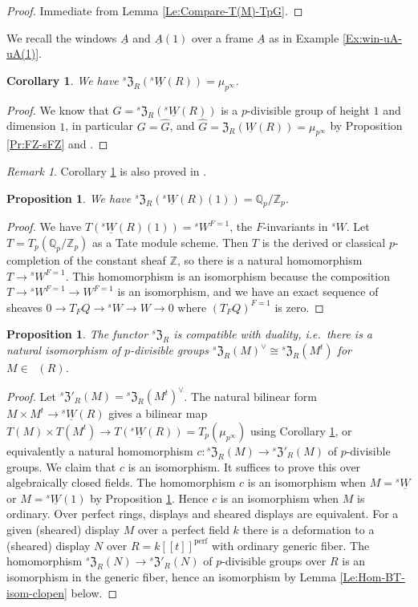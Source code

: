 \documentclass[a4paper,11pt]{amsart}
\theoremstyle{plain}
\newtheorem{Prop}[equation]{Proposition}
\newtheorem{Cor}[equation]{Corollary}
\theoremstyle{definition}
\theoremstyle{remark}
\newtheorem{Remark}[equation]{Remark}
\newcommand{\bPr}{\begin{Prop}}
\newcommand{\ePr}{\end{Prop}}
\newcommand{\bCo}{\begin{Cor}}
\newcommand{\eCo}{\end{Cor}}
\newcommand{\bRe}{\begin{Remark}}
\newcommand{\eRe}{\end{Remark}}
\newcommand{\bproof}{\begin{proof}}
\newcommand{\eproof}{\end{proof}}
\renewcommand{\u}{\underline}
\newcommand{\uM}{M} %
\newcommand{\uN}{N} %
\numberwithin{equation}{section}
\newcommand{\FZ}{\mathfrak{Z}}
\newcommand{\QQ}{{\mathbb{Q}}}
\newcommand{\ZZ}{{\mathbb{Z}}}
\DeclareMathOperator{\perf}{perf}
\DeclareMathOperator{\sDisp}{{}^sDisp}
\newcommand{\limperf}{^{\perf}}
\newcommand{\sFZ}{{}^s\FZ}
\newcommand{\sW}{{}^sW}
\newcommand{\usW}{{}^s\u W}
\begin{document}
\bproof
Immediate from Lemma \ref{Le:Compare-T(M)-TpG}.
\eproof

We recall the windows $\u A$ and $\u A(1)$ over a frame $\u A$ as in Example \ref{Ex:win-uA-uA(1)}.

\bCo
\label{Co:sFZ-usW-Gm}
We have $\sFZ_R(\usW(R))=\mu_{p^\infty}$.
\eCo

\bproof
We know that $G=\sFZ_R(\usW(R))$ is a $p$-divisible group of height $1$ and dimension $1$, in particular $G=\hat G$, and $\hat G=\FZ_R(\u W(R))=\mu_{p^{\infty}}$ by Proposition \ref{Pr:FZ-sFZ} and \cite[(211)]{Zink:The-display}. 
\eproof

\bRe
Corollary \ref{Co:sFZ-usW-Gm} is also proved in \cite[\S 3.6]{Drinfeld:Ring-stacks-conjecturally}.
\eRe

\bPr
\label{Pr:sFZ-usW1-QpZp}
We have $\sFZ_R(\usW(R)(1))=\QQ_p/\ZZ_p$.
\ePr

\bproof
We have $T(\usW(R)(1))=\sW^{F=1}$, the $F$-invariants in $\sW$. Let $T=T_p(\QQ_p/\ZZ_p)$ as a Tate module scheme. Then $T$ is the derived or classical $p$-completion of the constant sheaf $\ZZ$, so there is a natural homomorphism $T\to\sW^{F=1}$. This homomorphism is an isomorphism because the composition $T\to\sW^{F=1}\to W^{F=1}$ is an isomorphism, and we have an exact sequence of sheaves $0\to T_FQ\to\sW\to W\to 0$ where $(T_FQ)^{F=1}$ is zero.
\eproof

\bPr
\label{Pr:sFZ-duality}
The functor $\sFZ_R$ is compatible with duality, i.e.\ there is a natural isomorphism of $p$-divisible groups $\sFZ_R(\uM)^\vee\cong\sFZ_R(\uM^t)$ for $\uM\in\sDisp(R)$.
\ePr

\bproof
Let $\sFZ'_R(\uM)=\sFZ_R(\uM^t)^\vee$.
The natural bilinear form $\uM\times\uM^t\to\usW(R)$ gives a bilinear map $T(\uM)\times T(\uM^t)\to T(\usW(R))=T_p(\mu_{p^\infty})$ using Corollary \ref{Co:sFZ-usW-Gm}, or equivalently a natural homomorphism $c:\sFZ_R(\uM)\to\sFZ'_R(\uM)$ of $p$-divisible groups. We claim that $c$ is an isomorphism. It suffices to prove this over algebraically closed fields. The homomorphism $c$ is an isomorphism when $\uM=\usW$ or $\uM=\usW(1)$ by Proposition \ref{Pr:sFZ-usW1-QpZp}. Hence $c$ is an isomorphism when $\uM$ is ordinary.
Over perfect rings, displays and sheared displays are equivalent.
For a given (sheared) display $\uM$ over a perfect field $k$ there is a deformation to a (sheared) display $\uN$ over $R=k[[t]]\limperf$ with ordinary generic fiber. The homomorphism $\sFZ_R(\uN)\to\sFZ'_R(\uN)$ of $p$-divisible groups over $R$ is an isomorphism in the generic fiber, hence an isomorphism by Lemma \ref{Le:Hom-BT-isom-clopen} below.
\eproof
\end{document}
